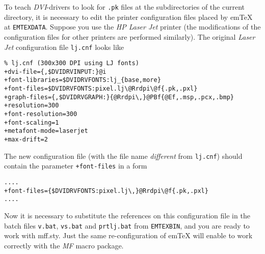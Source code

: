 To teach {\sl DVI}-drivers to look for {\tt .pk}
files at the subdirectories of the current directory,
it is necessary to edit the printer configuration files
placed by {\sf em\TeX} at {\tt\bs{}EMTEX\bs{}DATA\bs}.
Suppose you use the {\sl HP Laser Jet} printer (the modifications
of the configuration files for other printers are performed similarly).
The original {\sl Laser Jet} configuration file {\tt lj.cnf}
looks like
\begin{verbatim}
% lj.cnf (300x300 DPI using LJ fonts)
+dvi-file={,$DVIDRVINPUT:}@i
+font-libraries=$DVIDRVFONTS:lj_{base,more}
+font-files=$DVIDRVFONTS:pixel.lj\@Rrdpi\@f{.pk,.pxl}
+graph-files={,$DVIDRVGRAPH:}{@Rrdpi\,}@PBf{@Ef,.msp,.pcx,.bmp}
+resolution=300
+font-resolution=300
+font-scaling=1
+metafont-mode=laserjet
+max-drift=2
\end{verbatim}
The new configuration file (with the file name {\em different}
from {\tt lj.cnf}) should contain the parameter {\tt +font-files}
in a form
\begin{verbatim}
....
+font-files={$DVIDRVFONTS:pixel.lj\,}@Rrdpi\@f{.pk,.pxl}
....
\end{verbatim}
Now it is necessary to substitute the references on this
configuration file in the batch files {\tt v.bat}, {\tt vs.bat}
and {\tt prtlj.bat} from {\tt\bs{}EMTEX\bs{}BIN\bs{}},
and you are ready to work with {\sc mff.sty}.
Just the same re-configuration of {\sf em\TeX} will enable
to work correctly with the {\sl MF\PiC} macro package.

